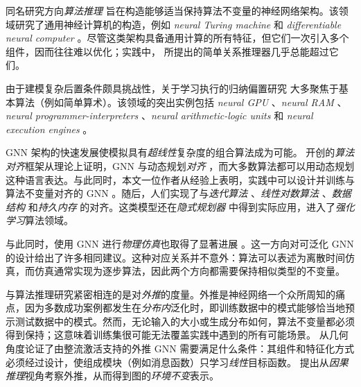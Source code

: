 同名研究方向\emph{算法推理} \citep[Section 3.3.]{cappart2021combinatorial} 旨在构造能够适当保持算法不变量的神经网络架构。该领域研究了通用神经计算机的构造，例如 \emph{neural Turing machine} \citep{graves2014neural} 和 \emph{differentiable neural computer} \citep{graves2016hybrid}。尽管这类架构具备通用计算的所有特征，但它们一次引入多个组件，因而往往难以优化；实践中，\citet{santoro2017simple,santoro2018relational} 所提出的简单关系推理器几乎总能超过它们。

由于建模复杂后置条件颇具挑战性，关于学习执行的归纳偏置研究 \citep{zaremba2014learning} 大多聚焦于基本算法（例如简单算术）。该领域的突出实例包括 \emph{neural GPU} \citep{kaiser2015neural}、\emph{neural RAM} \citep{kurach2015neural}、\emph{neural programmer-interpreters} \citep{reed2015neural}、\emph{neural arithmetic-logic units} \citep{trask2018neural,madsen2020neural} 和 \emph{neural execution engines} \citep{yan2020neural}。

GNN 架构的快速发展使模拟具有\emph{超线性}复杂度的组合算法成为可能。\citet{xu2019can} 开创的\emph{算法对齐}框架从理论上证明，GNN 与动态规划\emph{对齐} \citep{bellman1966dynamic}，而大多数算法都可以用动态规划这种语言表达。与此同时，本文一位作者从经验上表明，实践中可以设计并训练与算法不变量对齐的 GNN \citep{velivckovic2019neural}。随后，人们实现了与\emph{迭代算法} \citep{tang2020towards}、\emph{线性对数算法} \citep{freivalds2019neural}、\emph{数据结构} \citep{velivckovic2020pointer} 和\emph{持久内存} \citep{strathmann2021persistent} 的对齐。这类模型还在\emph{隐式规划器} \citep{deac2020xlvin} 中得到实际应用，进入了\emph{强化学习}算法领域。

与此同时，使用 GNN 进行\emph{物理仿真}也取得了显著进展 \citep{sanchez2020learning,pfaff2020learning}。这一方向对可泛化 GNN 的设计给出了许多相同建议。这种对应关系并不意外：算法可以表述为离散时间仿真，而仿真通常实现为逐步算法，因此两个方向都需要保持相似类型的不变量。

与算法推理研究紧密相连的是对\emph{外推}的度量。外推是神经网络一个众所周知的痛点，因为多数成功案例都发生在\emph{分布内}泛化时，即训练数据中的模式能够恰当地预示测试数据中的模式。然而，无论输入的大小或生成分布如何，算法不变量都必须得到保持；这意味着训练集很可能无法覆盖实践中遇到的所有可能场景。\citet{xu2020neural} 从几何角度论证了由整流激活支持的外推 GNN 需要满足什么条件：其组件和特征化方式必须经过设计，使组成模块（例如消息函数）只学习\emph{线性}目标函数。\citet{bevilacqua2021size} 提出从\emph{因果推理}视角考察外推，从而得到图的\emph{环境不变}表示。

